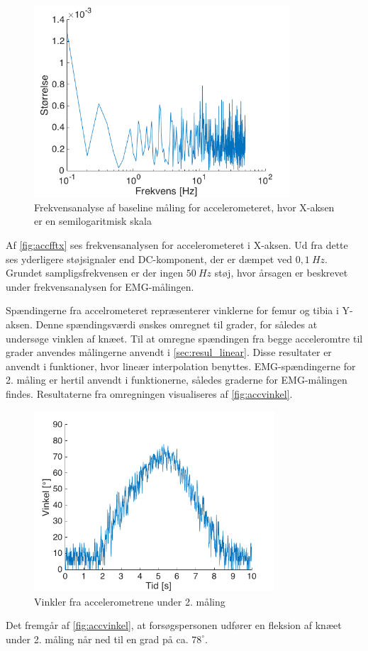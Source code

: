 \begin{figure}[H]
	\centering
	\includegraphics[width=0.85\textwidth]{figures/Pilotforsoeg/accfft.png}
	\caption{Frekvensanalyse af baseline måling for accelerometeret, hvor X-aksen er en semilogaritmisk skala}
	\label{fig:accfftx}
\end{figure}
Af \autoref{fig:accfftx} ses frekvensanalysen for accelerometeret i X-aksen. Ud fra dette ses yderligere støjsignaler end DC-komponent, der er dæmpet ved $0,1~Hz$. Grundet sampligsfrekvensen er der ingen $50~Hz$ støj, hvor årsagen er beskrevet under frekvensanalysen for EMG-målingen. 

Spændingerne fra accelrometeret repræsenterer vinklerne for femur og tibia i Y-aksen. Denne spændingsværdi ønskes omregnet til grader, for således at undersøge vinklen af knæet. Til at omregne spændingen fra begge acceleromtre til grader anvendes målingerne anvendt i \autoref{sec:resul_linear}. Disse resultater er anvendt i funktioner, hvor lineær interpolation benyttes. EMG-spændingerne for 2. måling er hertil anvendt i funktionerne, således graderne for EMG-målingen findes.
Resultaterne fra omregningen visualiseres af \autoref{fig:accvinkel}. 

\begin{figure}[H]
	\centering
	\includegraphics[width=0.8\textwidth]{figures/Pilotforsoeg/accvinkel}
	\caption{Vinkler fra accelerometrene under 2. måling}
	\label{fig:accvinkel}
\end{figure}
Det fremgår af \autoref{fig:accvinkel}, at forsøgspersonen udfører en fleksion af knæet under 2. måling når ned til en grad på ca. $78^{\circ}$. 


